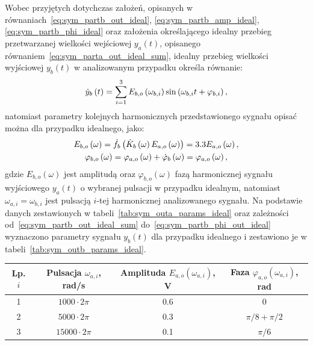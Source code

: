 Wobec przyjętych dotychczas założeń, opisanych w równaniach~\eqref{eq:sym_partb_out_ideal}, \eqref{eq:sym_partb_amp_ideal}, \eqref{eq:sym_partb_phi_ideal} oraz założenia określającego idealny przebieg przetwarzanej wielkości wejściowej $y_{a}(t)$, opisanego równaniem~\eqref{eq:sym_parta_out_ideal_sum}, idealny przebieg wielkości wyjściowej $y_{b}(t)$ w analizowanym przypadku określa równanie:
\begin{equation}
\dot{y}_{b} \left(t\right) = \sum _{i=1} ^{3} E_{b,o} \left(\omega_{b,i}\right) \sin \left(\omega_{b,i} t + \varphi_{b,i}\right) \label{eq:sym_partb_out_ideal_sum},
\end{equation}
natomiast parametry kolejnych harmonicznych przedstawionego sygnału opisać można dla przypadku idealnego, jako:
\begin{gather}
E_{b,o} \left(\omega\right) = \dot{f}_{b} \left(\dot{K}_{b} \left(\omega\right) E_{a,o} \left(\omega\right)\right) = 3.3 E_{a,o} \left(\omega\right) \label{eq:sym_partb_amp_out_ideal}, \\
\varphi_{b,o} \left(\omega\right) = \varphi_{a,o} \left(\omega\right) + \dot{\varphi}_{b} \left(\omega\right) = \varphi_{a,o} \left(\omega\right) \label{eq:sym_partb_phi_out_ideal},
\end{gather}
gdzie $E_{b,o}(\omega)$ jest amplitudą oraz $\varphi_{b,o}(\omega)$ fazą harmonicznej sygnału wyjściowego $y_{a}(t)$ o wybranej pulsacji w przypadku idealnym, natomiast $\omega_{a,i} = \omega_{b,i}$ jest pulsacją $i$-tej harmonicznej analizowanego sygnału. Na podstawie danych zestawionych w tabeli~\ref{tab:sym_outa_params_ideal} oraz zależności od~\eqref{eq:sym_partb_out_ideal_sum} do~\eqref{eq:sym_partb_phi_out_ideal} wyznaczono parametry sygnału $y_{b}(t)$ dla przypadku idealnego i zestawiono je w tabeli~\ref{tab:sym_outb_params_ideal}.

\begin{table}[htb!]
\begin{center}
\begin{tabular}[c]{| c | c | c | c |} \hline
\textbf{Lp. $i$} & \textbf{Pulsacja $\omega_{a,i}$, rad/s} & \textbf{Amplituda $E_{a,o}(\omega_{a,i})$, V} & \textbf{Faza $\varphi_{a,o}(\omega_{a,i})$, rad} \\ \hline
1 & $1000  \cdot 2\pi$ &  0.6 & $0$             \\ \hline
2 & $5000  \cdot 2\pi$ &  0.3 & $\pi/8 + \pi/2$ \\ \hline
3 & $15000 \cdot 2\pi$ &  0.1 & $\pi/6$         \\ \hline
\end{tabular}
\end{center}
\end{table}

